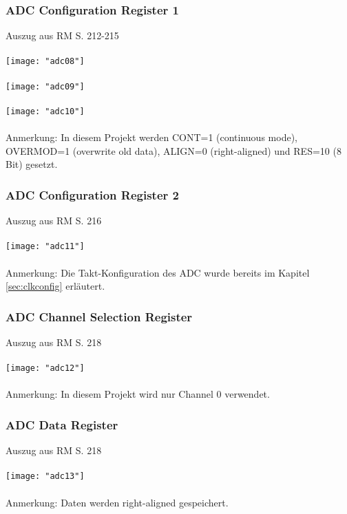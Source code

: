 \documentclass[11pt]{report}
\begin{document}
			\subsubsection{ADC Configuration Register 1}
				Auszug aus RM S. 212-215\\
				\\\texttt{[image: "adc08"]}\\
				\\\texttt{[image: "adc09"]}\\
				\\\texttt{[image: "adc10"]}\\
				\\Anmerkung: In diesem Projekt werden CONT=1 (continuous mode), OVERMOD=1 (overwrite old data), ALIGN=0 (right-aligned) und RES=10 (8 Bit) gesetzt.
			\subsubsection{ADC Configuration Register 2}
				Auszug aus RM S. 216\\
				\\\texttt{[image: "adc11"]}\\
				\\Anmerkung: Die Takt-Konfiguration des ADC wurde bereits im Kapitel \ref{sec:clkconfig} erläutert.
			\subsubsection{ADC Channel Selection Register}
				Auszug aus RM S. 218\\
				\\\texttt{[image: "adc12"]}\\
				\\Anmerkung: In diesem Projekt wird nur Channel 0 verwendet.
			\subsubsection{ADC Data Register}
				Auszug aus RM S. 218\\
				\\\texttt{[image: "adc13"]}\\
				\\Anmerkung: Daten werden right-aligned gespeichert.
\end{document}
